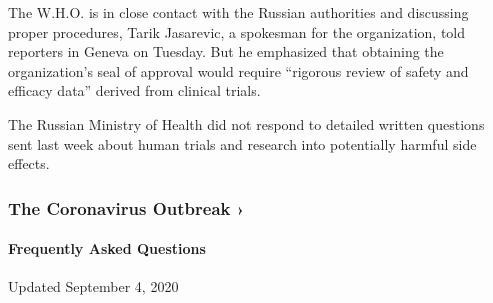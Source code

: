 The W.H.O. is in close contact with the Russian authorities and
discussing proper procedures, Tarik Jasarevic, a spokesman for the
organization, told reporters in Geneva on Tuesday. But he emphasized
that obtaining the organization's seal of approval would require
``rigorous review of safety and efficacy data'' derived from clinical
trials.

The Russian Ministry of Health did not respond to detailed written
questions sent last week about human trials and research into
potentially harmful side effects.

\href{https://www.nytimes3xbfgragh.onion/news-event/coronavirus?action=click\&pgtype=Article\&state=default\&region=MAIN_CONTENT_3\&context=storylines_faq}{}

\hypertarget{the-coronavirus-outbreak-}{%
\subsubsection{The Coronavirus Outbreak
›}\label{the-coronavirus-outbreak-}}

\hypertarget{frequently-asked-questions}{%
\paragraph{Frequently Asked
Questions}\label{frequently-asked-questions}}

Updated September 4, 2020

